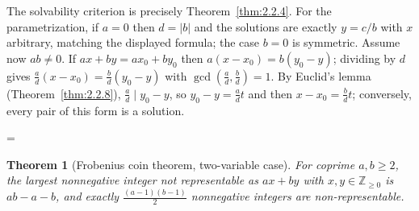 \documentclass[11pt]{article}
\makeatletter
\theoremstyle{ntstyle}
\newtheorem{theorem}{Theorem}[subsection]
\let\nt@closedisplay\]
\def\nt@guardedclose{\@ifnextchar\par{\nt@closeafterpar}{\@ifnextchar\end{\postdisplaypenalty\@M\nt@closedisplay}{\nt@closedisplay}}}
\def\nt@closeafterpar\par{\@ifnextchar\par{\nt@closeafterpar}{\@ifnextchar\end{\postdisplaypenalty\@M\nt@closedisplay\par}{\nt@closedisplay\par}}}
\renewenvironment{proof}[1][\proofname]{\par
  \pushQED{\qed}\normalfont\topsep\medskipamount\edef\nt@afterproof{\@endparpenalty=\the\@endparpenalty\relax}\@beginparpenalty\@M\@endparpenalty\@M\let\]\nt@guardedclose\trivlist\item[]\textit{#1\@addpunct{.}} \ignorespaces}{\ifvmode\addpenalty\@M\fi\popQED\nt@afterproof\endtrivlist\@endpefalse}
\makeatother
\begin{document}
\begin{proof} The solvability criterion is precisely Theorem~\ref{thm:2.2.4}. For the parametrization, if $a=0$ then $d=|b|$ and the solutions are exactly $y=c/b$ with $x$ arbitrary, matching the displayed formula; the case $b=0$ is symmetric. Assume now $ab\neq0$. If $ax+by=ax_0+by_0$ then $a(x-x_0)=b(y_0-y)$; dividing by $d$ gives $\tfrac{a}{d}(x-x_0)=\tfrac{b}{d}(y_0-y)$ with
	$\gcd(\tfrac{a}{d}, \tfrac{b}{d})=1$. By Euclid's lemma (Theorem~\ref{thm:2.2.8}), $\tfrac{a}{d}\mid
		y_0-y$, so $y_0-y=\tfrac{a}{d} t$ and then $x-x_0=\tfrac{b}{d} t$;
	conversely, every pair of this form is a solution.

\end{proof}
\begin{theorem}[Frobenius coin theorem, two-variable case]\label{thm:2.6.2} For coprime $a,b\ge2$, the largest nonnegative integer not
	representable as $ax+by$ with $x,y\in\mathbb{Z}_{\ge0}$ is $ab-a-b$, and
	exactly $\tfrac{(a-1)(b-1)}{2}$ nonnegative integers are non-representable.

\end{theorem}
\end{document}
